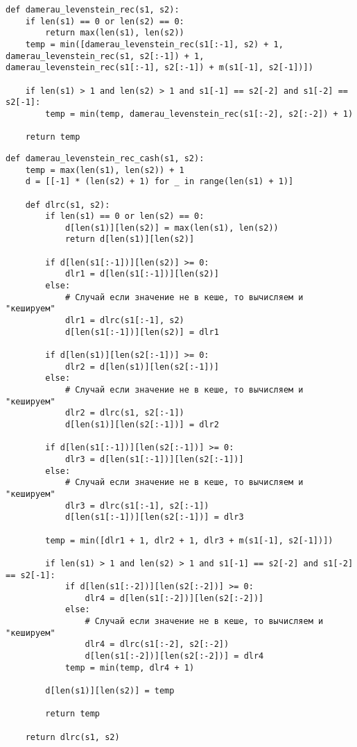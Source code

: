 \clearpage

\begin{lstlisting}[label=lst:dameray_lev_mtr,caption=Функция нахождения расстояния Дамерау-Левенштейна рекурсивно]
def damerau_levenstein_rec(s1, s2):
	if len(s1) == 0 or len(s2) == 0:
		return max(len(s1), len(s2))
	temp = min([damerau_levenstein_rec(s1[:-1], s2) + 1, damerau_levenstein_rec(s1, s2[:-1]) + 1, damerau_levenstein_rec(s1[:-1], s2[:-1]) + m(s1[-1], s2[-1])])

	if len(s1) > 1 and len(s2) > 1 and s1[-1] == s2[-2] and s1[-2] == s2[-1]:
		temp = min(temp, damerau_levenstein_rec(s1[:-2], s2[:-2]) + 1)

	return temp
\end{lstlisting}

\clearpage

\begin{lstlisting}[label=lst:dameray_lev_rec_hash,caption=Функция нахождения расстояния Дамерау-Левенштейна рекурсивно c кешированием]
def damerau_levenstein_rec_cash(s1, s2):
	temp = max(len(s1), len(s2)) + 1
	d = [[-1] * (len(s2) + 1) for _ in range(len(s1) + 1)]

	def dlrc(s1, s2):
		if len(s1) == 0 or len(s2) == 0:
			d[len(s1)][len(s2)] = max(len(s1), len(s2))
			return d[len(s1)][len(s2)]

		if d[len(s1[:-1])][len(s2)] >= 0:
			dlr1 = d[len(s1[:-1])][len(s2)]
		else:
			# Случай если значение не в кеше, то вычисляем и "кешируем"
			dlr1 = dlrc(s1[:-1], s2)
			d[len(s1[:-1])][len(s2)] = dlr1

		if d[len(s1)][len(s2[:-1])] >= 0:
			dlr2 = d[len(s1)][len(s2[:-1])]
		else:
			# Случай если значение не в кеше, то вычисляем и "кешируем"
			dlr2 = dlrc(s1, s2[:-1])
			d[len(s1)][len(s2[:-1])] = dlr2

		if d[len(s1[:-1])][len(s2[:-1])] >= 0:
			dlr3 = d[len(s1[:-1])][len(s2[:-1])]
		else:
			# Случай если значение не в кеше, то вычисляем и "кешируем"
			dlr3 = dlrc(s1[:-1], s2[:-1])
			d[len(s1[:-1])][len(s2[:-1])] = dlr3

		temp = min([dlr1 + 1, dlr2 + 1, dlr3 + m(s1[-1], s2[-1])])

		if len(s1) > 1 and len(s2) > 1 and s1[-1] == s2[-2] and s1[-2] == s2[-1]:
			if d[len(s1[:-2])][len(s2[:-2])] >= 0:
				dlr4 = d[len(s1[:-2])][len(s2[:-2])]
			else:
				# Случай если значение не в кеше, то вычисляем и "кешируем"
				dlr4 = dlrc(s1[:-2], s2[:-2])
				d[len(s1[:-2])][len(s2[:-2])] = dlr4
			temp = min(temp, dlr4 + 1)

		d[len(s1)][len(s2)] = temp

		return temp

	return dlrc(s1, s2)
\end{lstlisting}

